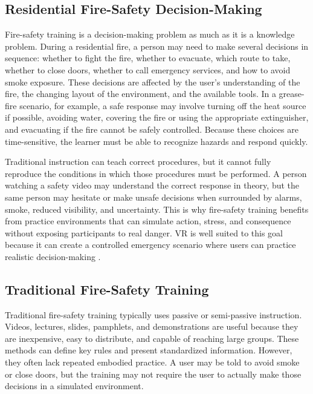 \documentclass[manuscript, review]{acmart}
\begin{document}
{\subsection{Residential Fire-Safety Decision-Making}

Fire-safety training is a decision-making problem as much as it is a knowledge problem. During a residential fire, a person may need to make several decisions in sequence: whether to fight the fire, whether to evacuate, which route to take, whether to close doors, whether to call emergency services, and how to avoid smoke exposure. These decisions are affected by the user's understanding of the fire, the changing layout of the environment, and the available tools. In a grease-fire scenario, for example, a safe response may involve turning off the heat source if possible, avoiding water, covering the fire or using the appropriate extinguisher, and evacuating if the fire cannot be safely controlled. Because these choices are time-sensitive, the learner must be able to recognize hazards and respond quickly.

Traditional instruction can teach correct procedures, but it cannot fully reproduce the conditions in which those procedures must be performed. A person watching a safety video may understand the correct response in theory, but the same person may hesitate or make unsafe decisions when surrounded by alarms, smoke, reduced visibility, and uncertainty. This is why fire-safety training benefits from practice environments that can simulate action, stress, and consequence without exposing participants to real danger. VR is well suited to this goal because it can create a controlled emergency scenario where users can practice realistic decision-making \cite{kanade2022use,scorgie2024virtual,somerkoski2020digital}.

\subsection{Traditional Fire-Safety Training}

Traditional fire-safety training typically uses passive or semi-passive instruction. Videos, lectures, slides, pamphlets, and demonstrations are useful because they are inexpensive, easy to distribute, and capable of reaching large groups. These methods can define key rules and present standardized information. However, they often lack repeated embodied practice. A user may be told to avoid smoke or close doors, but the training may not require the user to actually make those decisions in a simulated environment.

}
\end{document}
